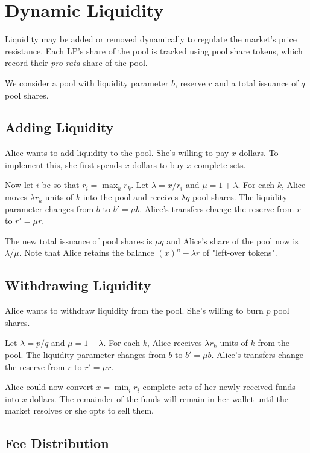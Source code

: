 \documentclass[12pt]{article}
\begin{document}
\section{Dynamic Liquidity}

Liquidity may be added or removed dynamically to regulate the market's price resistance. Each LP's share of the pool is tracked using pool share tokens, which record their \emph{pro rata} share of the pool.

We consider a pool with liquidity parameter $b$, reserve $r$ and a total issuance of $q$ pool shares.

\subsection{Adding Liquidity}

Alice wants to add liquidity to the pool. She's willing to pay $x$ dollars. To implement this, she first spends $x$ dollars to buy $x$ complete sets.

Now let $i$ be so that $r_i = \max_k r_k$. Let $\lambda = x / r_i$ and $\mu = 1 + \lambda$. For each $k$, Alice moves $\lambda r_k$ units of $k$ into the pool and receives $\lambda q$ pool shares. The liquidity parameter changes from $b$ to $b' = \mu b$. Alice's transfers change the reserve from $r$ to $r' = \mu r$.

The new total issuance of pool shares is $\mu q$ and Alice's share of the pool now is $\lambda / \mu$. Note that Alice retains the balance $(x)^n - \lambda r$ of "left-over tokens".

\subsection{Withdrawing Liquidity}

Alice wants to withdraw liquidity from the pool. She's willing to burn $p$ pool shares.

Let $\lambda = p / q$ and $\mu = 1 - \lambda$. For each $k$, Alice receives $\lambda r_k$ units of $k$ from the pool. The liquidity parameter changes from $b$ to $b' = \mu b$. Alice's transfers change the reserve from $r$ to $r' = \mu r$.

Alice could now convert $x = \min_i r_i$ complete sets of her newly received funds into $x$ dollars. The remainder of the funds will remain in her wallet until the market resolves or she opts to sell them.

\subsection{Fee Distribution}
\end{document}
